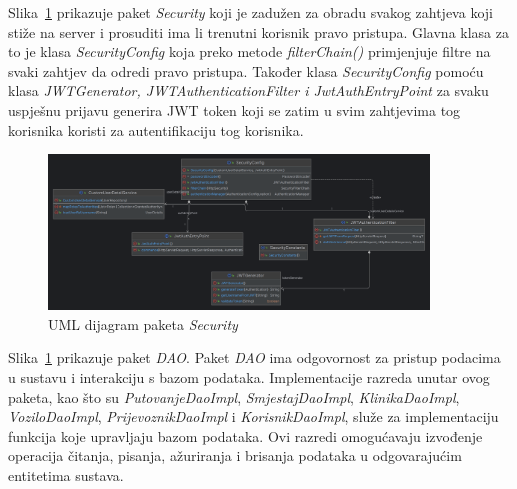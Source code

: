 			
			Slika~\ref{fig:security} prikazuje paket \textit{Security} koji je zadužen za obradu svakog zahtjeva koji stiže na server i prosuditi ima li trenutni korisnik pravo pristupa. Glavna klasa za to je klasa \textit{SecurityConfig} koja preko metode \textit{filterChain()} primjenjuje filtre na svaki zahtjev da odredi pravo pristupa. Također klasa \textit{SecurityConfig} pomoću klasa \textit{JWTGenerator, JWTAuthenticationFilter i JwtAuthEntryPoint} za svaku uspješnu prijavu generira JWT token koji se zatim u svim zahtjevima tog korisnika koristi za autentifikaciju tog korisnika.
			
			\begin{figure}[htbp]
				\centering
				\includegraphics[width=0.9\textwidth]{slike/security}
				\caption{UML dijagram paketa \textit{Security}}
				\label{fig:security}
			\end{figure}
			
			\eject
			
			Slika~\ref{fig:security} prikazuje paket \textit{DAO}. Paket \textit{DAO} ima odgovornost za pristup podacima u sustavu i interakciju s bazom podataka. Implementacije razreda unutar ovog paketa, kao što su \textit{PutovanjeDaoImpl}, \textit{SmjestajDaoImpl}, \textit{KlinikaDaoImpl}, \textit{VoziloDaoImpl}, \textit{PrijevoznikDaoImpl} i \textit{KorisnikDaoImpl}, služe za implementaciju funkcija koje upravljaju bazom podataka. Ovi razredi omogućavaju izvođenje operacija čitanja, pisanja, ažuriranja i brisanja podataka u odgovarajućim entitetima sustava.
			
